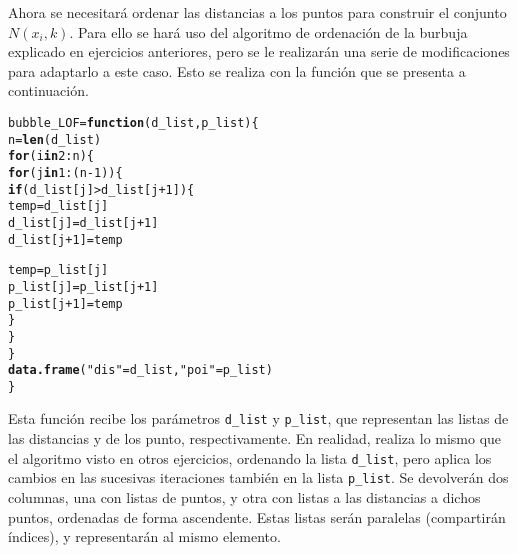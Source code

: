 \documentclass[12pt]{report}\usepackage[]{graphicx}\usepackage[dvipsnames]{xcolor}
\makeatletter
\newcommand{\hlnum}[1]{\textcolor[rgb]{0.686,0.059,0.569}{#1}}%
\newcommand{\hlstr}[1]{\textcolor[rgb]{0.192,0.494,0.8}{#1}}%
\newcommand{\hlopt}[1]{\textcolor[rgb]{0,0,0}{#1}}%
\newcommand{\hlstd}[1]{\textcolor[rgb]{0.345,0.345,0.345}{#1}}%
\newcommand{\hlkwa}[1]{\textcolor[rgb]{0.161,0.373,0.58}{\textbf{#1}}}%
\newcommand{\hlkwb}[1]{\textcolor[rgb]{0.69,0.353,0.396}{#1}}%
\newcommand{\hlkwc}[1]{\textcolor[rgb]{0.333,0.667,0.333}{#1}}%
\newcommand{\hlkwd}[1]{\textcolor[rgb]{0.737,0.353,0.396}{\textbf{#1}}}%
\newenvironment{kframe}{%
 \def\at@end@of@kframe{}%
 \ifinner\ifhmode%
  \def\at@end@of@kframe{\end{minipage}}%
  \begin{minipage}{\columnwidth}%
 \fi\fi%
 \def\FrameCommand##1{\hskip\@totalleftmargin \hskip-\fboxsep
 \colorbox{shadecolor}{##1}\hskip-\fboxsep
     \hskip-\linewidth \hskip-\@totalleftmargin \hskip\columnwidth}%
 \MakeFramed {\advance\hsize-\width
   \@totalleftmargin\z@ \linewidth\hsize
   \@setminipage}}%
 {\par\unskip\endMakeFramed%
 \at@end@of@kframe}
\newenvironment{knitrout}{}{} %
\makeatother
\begin{document}
					Ahora se necesitará ordenar las distancias a los puntos para construir el conjunto $N(x_i, k)$. Para ello se hará uso del algoritmo de ordenación de la burbuja explicado en ejercicios anteriores, pero se le realizarán una serie de modificaciones para adaptarlo a este caso. Esto se realiza con la función que se presenta a continuación. 
					
\begin{knitrout}
\color{fgcolor}\begin{kframe}
\begin{alltt}
\hlstd{bubble_LOF} \hlkwb{=} \hlkwa{function}\hlstd{(}\hlkwc{d_list}\hlstd{,} \hlkwc{p_list}\hlstd{)\{}
        \hlstd{n} \hlkwb{=} \hlkwd{len}\hlstd{(d_list)}
        \hlkwa{for} \hlstd{(i} \hlkwa{in} \hlnum{2}\hlopt{:}\hlstd{n)\{}
                \hlkwa{for} \hlstd{(j} \hlkwa{in} \hlnum{1}\hlopt{:}\hlstd{(n}\hlopt{-}\hlnum{1}\hlstd{))\{}
                        \hlkwa{if} \hlstd{(d_list[j]} \hlopt{>} \hlstd{d_list[j}\hlopt{+}\hlnum{1}\hlstd{])\{}
                                \hlstd{temp} \hlkwb{=} \hlstd{d_list[j]}
                                \hlstd{d_list[j]} \hlkwb{=} \hlstd{d_list[j}\hlopt{+}\hlnum{1}\hlstd{]}
                                \hlstd{d_list[j}\hlopt{+}\hlnum{1}\hlstd{]} \hlkwb{=} \hlstd{temp}

                                \hlstd{temp} \hlkwb{=} \hlstd{p_list[j]}
                                \hlstd{p_list[j]} \hlkwb{=} \hlstd{p_list[j}\hlopt{+}\hlnum{1}\hlstd{]}
                                \hlstd{p_list[j}\hlopt{+}\hlnum{1}\hlstd{]} \hlkwb{=} \hlstd{temp}
                        \hlstd{\}}
                \hlstd{\}}
        \hlstd{\}}
        \hlkwd{data.frame}\hlstd{(}\hlstr{"dis"}\hlstd{=d_list,} \hlstr{"poi"}\hlstd{=p_list)}
\hlstd{\}}
\end{alltt}
\end{kframe}
\end{knitrout}
					
					Esta función recibe los parámetros \texttt{d\_list} y \texttt{p\_list}, que representan las listas de las distancias y de los punto, respectivamente. En realidad, realiza lo mismo que el algoritmo visto en otros ejercicios, ordenando la lista \texttt{d\_list}, pero aplica los cambios en las sucesivas iteraciones también en la lista \texttt{p\_list}. Se devolverán dos columnas, una con listas de puntos, y otra con listas a las distancias a dichos puntos, ordenadas de forma ascendente. Estas listas serán paralelas (compartirán índices), y representarán al mismo elemento. \\
					
\end{document}
